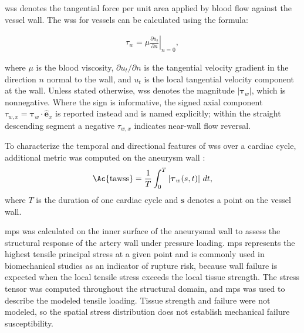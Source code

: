 \documentclass[12pt,a4paper]{article}
\newcommand{\cfdrevision}[1]{#1} %
\newcommand{\WSS}{\ac{wss}\xspace}
\newcommand{\MPS}{\ac{mps}\xspace}
\newcommand{\WSScap}{\Ac{wss}\xspace}
\newcommand{\TAWSScap}{\Ac{tawss}\xspace}
\newcommand{\MPScap}{\Ac{mps}\xspace}
\renewcommand{\vec}[1]{\boldsymbol{\mathbf{#1}}}
\theoremstyle{definition}
\numberwithin{equation}{section}
\providecommand{\DIFaddtex}[1]{{\protect\color{blue} \sf #1}} %
\providecommand{\DIFdeltex}[1]{{\protect\color{red} \scriptsize #1}} %
\providecommand{\DIFaddbegin}{} %
\providecommand{\DIFaddend}{} %
\providecommand{\DIFdelbegin}{} %
\providecommand{\DIFdelend}{} %
\providecommand{\DIFadd}[1]{\texorpdfstring{\DIFaddtex{#1}}{#1}} %
\providecommand{\DIFdel}[1]{\texorpdfstring{\DIFdeltex{#1}}{}} %
\newcommand{\DIFscaledelfig}{0.5}
\newlength{\DIFdelgraphicswidth} %
\newlength{\DIFdelgraphicsheight} %
\newcommand{\DIFaddincludegraphics}[2][]{{\color{blue}\fbox{\DIFOincludegraphics[#1]{#2}}}} %
\newcommand{\DIFdelincludegraphics}[2][]{%
\sbox{\DIFdelgraphicsbox}{\DIFOincludegraphics[#1]{#2}}%
\settoboxwidth{\DIFdelgraphicswidth}{\DIFdelgraphicsbox} %
\settoboxtotalheight{\DIFdelgraphicsheight}{\DIFdelgraphicsbox} %
\scalebox{\DIFscaledelfig}{%
\parbox[b]{\DIFdelgraphicswidth}{\usebox{\DIFdelgraphicsbox}\\[-\baselineskip] \rule{\DIFdelgraphicswidth}{0em}}\llap{\resizebox{\DIFdelgraphicswidth}{\DIFdelgraphicsheight}{%
\setlength{\unitlength}{\DIFdelgraphicswidth}%
\begin{picture}(1,1)%
\thicklines\linethickness{2pt} %
{\color[rgb]{1,0,0}\put(0,0){\framebox(1,1){}}}%
{\color[rgb]{1,0,0}\put(0,0){\line( 1,1){1}}}%
{\color[rgb]{1,0,0}\put(0,1){\line(1,-1){1}}}%
\end{picture}%
}\hspace*{3pt}}} %
} %
\DeclareRobustCommand{\DIFaddbegin}{\DIFOaddbegin \let\includegraphics\DIFaddincludegraphics} %
\DeclareRobustCommand{\DIFaddend}{\DIFOaddend \let\includegraphics\DIFOincludegraphics} %
\DeclareRobustCommand{\DIFdelbegin}{\DIFOdelbegin \let\includegraphics\DIFdelincludegraphics} %
\DeclareRobustCommand{\DIFdelend}{\DIFOaddend \let\includegraphics\DIFOincludegraphics} %
\renewcommand{\DIFaddtex}[1]{{\protect\color{red}#1}}
\renewcommand{\DIFdeltex}[1]{}
\renewcommand{\DIFdel}[1]{}
\renewcommand{\DIFaddincludegraphics}[2][]{\DIFOincludegraphics[#1]{#2}}
\renewcommand{\DIFdelincludegraphics}[2][]{}
\renewcommand{\cfdrevision}[1]{\textcolor{red}{#1}}
\def\DIFaddbegin{}\def\DIFaddend{}%
\def\DIFdelbegin{}\def\DIFdelend{}%
\def\cfdrevision#1{#1}%
\begin{document}
\hspace*{\parindent} \WSScap  denotes the tangential force per unit area applied by blood flow against the vessel wall. The \WSS for vessels \cite{potters2015volumetric} can be calculated using the formula:

\begin{align}
    \tau_w = \mu \left. \frac{\partial {u_t}}{\partial n} \right|_{n=0},
\end{align}

where \(\mu\) is the blood viscosity, \(\partial u_t/\partial n\) is the tangential velocity gradient in the direction \(n\) normal to the wall, and \(u_t\) is the local tangential velocity component at the wall. Unless stated otherwise, \WSS denotes the magnitude \(|\vec{\tau}_w|\), which is nonnegative. Where the sign is informative, the signed axial component \(\tau_{w,x}=\vec{\tau}_w\cdot\hat{\vec{e}}_x\) is reported instead and is named explicitly; within the straight descending segment a negative \(\tau_{w,x}\) indicates near-wall flow reversal.

To characterize the temporal and directional features of \WSS over a cardiac cycle, additional metric was computed on the aneurysm wall \cite{morbiducci2010outflow, turk2021characterization}:
\begin{equation}
\mathrm{\TAWSScap} = \frac{1}{T}\int_{0}^{T} \left| \vec{\tau}_w(s,t) \right| \, dt,
\label{eq:tawss}
\end{equation}
where $T$ is the duration of one cardiac cycle and $\mathbf{s}$ denotes a point on the vessel wall. 

\MPScap was calculated on the inner surface of the aneurysmal wall to assess the structural response of the artery wall under pressure loading. \MPS represents the highest tensile principal stress at a given point and is commonly used in biomechanical studies as an indicator of rupture risk, because wall failure is expected when the local tensile stress exceeds the local tissue strength. \DIFdelbegin \DIFdel{The stress tensor was computed throughout the structural domain, and the spatial distribution of }%
\DIFdel{was analyzed to identify regions of elevated wall stress that may be more susceptible to mechanical failure.
}\DIFdelend \DIFaddbegin \DIFadd{\cfdrevision{The stress tensor was computed throughout the structural domain, and \MPS was used to describe the modeled tensile loading. Tissue strength and failure were not modeled, so the spatial stress distribution does not establish mechanical failure susceptibility.}
}\DIFaddend 
\end{document}

